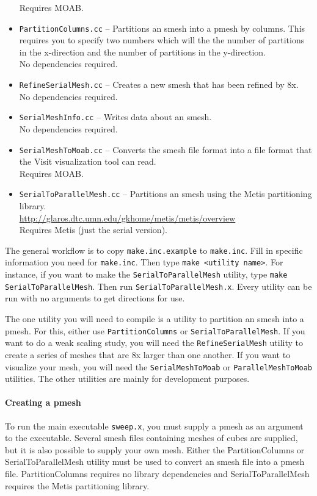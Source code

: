 \documentclass[12pt,letterpaper]{article}
\begin{document}
\begin{itemize}
{\color{red} Requires MOAB.}
\item {\tt PartitionColumns.cc} -- Partitions an smesh into a pmesh by columns.  This requires you to specify two numbers which will the the number of partitions in the x-direction and the number of partitions in the y-direction. \\
{\color{red} No dependencies required.}
\item {\tt RefineSerialMesh.cc} -- Creates a new smesh that has been refined by 8x.\\
{\color{red} No dependencies required.}
\item {\tt SerialMeshInfo.cc} -- Writes data about an smesh.\\
{\color{red} No dependencies required.}
\item {\tt SerialMeshToMoab.cc} -- Converts the smesh file format into a file format that the Visit visualization tool can read.\\
{\color{red} Requires MOAB.}
\item {\tt SerialToParallelMesh.cc} -- Partitions an smesh using the Metis partitioning library.\\
\url{http://glaros.dtc.umn.edu/gkhome/metis/metis/overview} \\
{\color{red} Requires Metis (just the serial version).}
\end{itemize}

The general workflow is to copy {\tt make.inc.example} to {\tt make.inc}.
Fill in specific information you need for {\tt make.inc}.
Then type {\tt make <utility name>}.
For instance, if you want to make the {\tt SerialToParallelMesh} utility, type {\tt make SerialToParallelMesh}.
Then run {\tt SerialToParallelMesh.x}.
Every utility can be run with no arguments to get directions for use.

The one utility you will need to compile is a utility to partition an smesh into a pmesh.
For this, either use {\tt PartitionColumns} or {\tt SerialToParallelMesh}.
If you want to do a weak scaling study, you will need the {\tt RefineSerialMesh} utility to create a series of meshes that are 8x larger than one another.
If you want to visualize your mesh, you will need the {\tt SerialMeshToMoab} or {\tt ParallelMeshToMoab} utilities.
The other utilities are mainly for development purposes.

\paragraph{Creating a pmesh}
To run the main executable {\tt sweep.x}, you must supply a pmesh as an argument to the executable.
Several smesh files containing meshes of cubes are supplied, but it is also possible to supply your own mesh.
Either the PartitionColumns or SerialToParallelMesh utility must be used to convert an smesh file into a pmesh file.
PartitionColumns requires no library dependencies and SerialToParallelMesh requires the Metis partitioning library.
\end{document}
